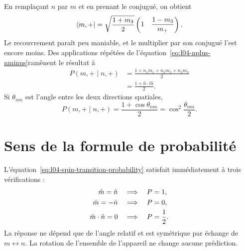 En remplaçant \(n\) par \(m\) et en prenant le conjugué, on obtient
\begin{equation}
  \left\langle m,+\right\rvert
  =
  \sqrt{\frac{1+m_3}{2}}
  \begin{pmatrix}
    1&
    \dfrac{1-m_3}{m_+}
  \end{pmatrix}.
\end{equation}
Le recouvrement paraît peu maniable, et le multiplier par son conjugué l’est encore moins. Des applications répétées de l’équation~\eqref{eq:l04-nplus-nminus}ramènent le résultat à
\begin{equation}
  \begin{aligned}
    P(m,+\mid n,+)
    &=\frac{1+n_1m_1+n_2m_2+n_3m_3}{2}\\
    &=\frac{1+\hat n\cdot\hat m}{2}.
  \end{aligned}
  \label{eq:l04-spin-transition-probability}
\end{equation}
Si \(\theta_{nm}\) est l’angle entre les deux directions spatiales,
\begin{equation}
  P(m,+\mid n,+)
  =
  \frac{1+\cos\theta_{nm}}{2}
  =
  \cos^2\frac{\theta_{nm}}{2}.
  \label{eq:l04-half-angle-probability}
\end{equation}

\begin{classroomqa}
\end{classroomqa}

\section{Sens de la formule de probabilité}

L’équation~\eqref{eq:l04-spin-transition-probability} satisfait immédiatement à trois vérifications :
\begin{align}
  \hat m=\hat n
  &\quad\Longrightarrow\quad P=1,
  \notag\\
  \hat m=-\hat n
  &\quad\Longrightarrow\quad P=0,
  \notag\\
  \hat m\cdot\hat n=0
  &\quad\Longrightarrow\quad P=\frac12.
\end{align}
La réponse ne dépend que de l’angle relatif et est symétrique par échange de \(m\leftrightarrow n\). La rotation de l’ensemble de l’appareil ne change aucune prédiction.

